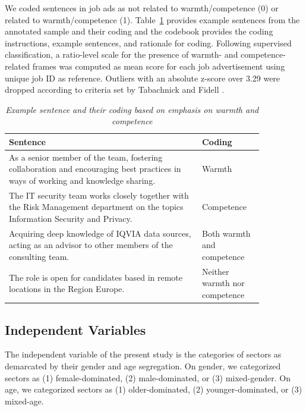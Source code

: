 \documentclass[Royal,sageapa,times]{sagej}
\begin{document}
We coded sentences in job ads as not related to warmth/competence (0) or related to warmth/competence (1). Table~\ref{table3} provides example sentences from the annotated sample and their coding and the codebook provides the coding instructions, example sentences, and rationale for coding. Following supervised classification, a ratio-level scale for the presence of warmth- and competence-related frames was computed as mean score for each job advertisement using unique job ID as reference. Outliers with an absolute z-score over 3.29 were dropped according to criteria set by Tabachnick and Fidell .

\begin{table}[ht]
    \small\sf\centering
    \caption{\textit{Example sentence and their coding based on emphasis on warmth and competence}}
    \label{table3}
    \vskip 4pt
    \begin{tabular}[]{@{}m{0.65\linewidth} m{0.20\linewidth}@{}}
    \toprule
    Sentence & Coding\\
    \midrule
    As a senior member of the team, fostering collaboration and encouraging best practices in ways of working and knowledge sharing. & Warmth\\
    \midrule
    The IT security team works closely together with the Risk Management department on the topics Information Security and Privacy. & Competence\\
    \midrule
    Acquiring deep knowledge of IQVIA data sources, acting as an advisor to other members of the consulting team. & Both warmth and competence\\
    \midrule
    The role is open for candidates based in remote locations in the Region Europe. & Neither warmth nor competence\\
    \bottomrule
    \end{tabular}%
    \end{table}

\subsection{Independent Variables}
\label{independent_variables}
The independent variable of the present study is the categories of sectors as demarcated by their gender and age segregation. On gender, we categorized sectors as (1) female-dominated, (2) male-dominated, or (3) mixed-gender. On age, we categorized sectors as (1) older-dominated, (2) younger-dominated, or (3) mixed-age.
\end{document}
